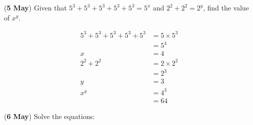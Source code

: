 \documentclass[12pt, answers]{exam} %
\begin{document}
\begin{questions}
	\question (\textbf{5 May}) Given that \(5^3 + 5^3 + 5^3 + 5^3 + 5^3 = 5^x\) and
	\(2^2 + 2^2 = 2^y\), find the value of \(x^y\).
	\begin{solution}
		\begin{align*}
			5^3 + 5^3 + 5^3 + 5^3 + 5^3 & = 5 \times 5^3               \\
			                            & = 5^4                        \\
			x                           & = 4 \label{eq:05051} \tag{1} \\
			2^2 + 2^2                   & = 2 \times 2^2               \\
			                            & = 2^3                        \\
			y                           & = 3 \label{eq:05052} \tag{2} \\
			x^y                         & = 4^3                        \\
			                            & = 64
		\end{align*}
	\end{solution}

	\question (\textbf{6 May}) Solve the equations:
\end{questions}
\end{document}
